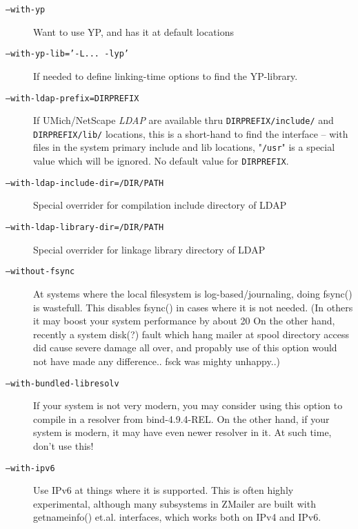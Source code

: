 \begin{multicols}{2}
\begin{description}
\item[\tt --with-yp] \mbox{}

Want to use YP, and has it at default locations

\item[\tt --with-yp-lib='-L... -lyp'] \mbox{}

If needed to define linking-time options to find the YP-library.

\item[\tt --with-ldap-prefix=DIRPREFIX] \mbox{}

If UMich/NetScape {\em LDAP} are available thru {\tt DIRPREFIX/include/}
and {\tt DIRPREFIX/lib/} locations, this is a short-hand to find
the interface -- with files in the system primary include
and lib locations,  "{\tt /usr}" is a special value which will be
ignored.  No default value for {\tt DIRPREFIX}.

\item[\tt --with-ldap-include-dir=/DIR/PATH] \mbox{}

Special overrider for compilation include directory of LDAP

\item[\tt --with-ldap-library-dir=/DIR/PATH] \mbox{}

Special overrider for linkage library directory of LDAP

\item[\tt --without-fsync] \mbox{}

At systems where the local filesystem is log-based/journaling,
doing   fsync()  is wastefull.  This disables fsync() in
cases where it is not needed.    (In others it may boost
your system performance by about 20%
On the other hand, recently a system disk(?) fault which
hang mailer at spool directory access did cause severe
damage all over, and propably use of this option would
not have made any difference..  fsck was mighty unhappy..)

\item[\tt --with-bundled-libresolv] \mbox{}

If your system is not very modern, you may consider using
this option to compile in a resolver from bind-4.9.4-REL.
On the other hand, if your system is modern, it may have
even newer resolver in it.  At such time, don't use this!

\item[\tt --with-ipv6] \mbox{}

Use IPv6 at things where it is supported.  This is often
highly experimental, although many subsystems in ZMailer
are built with   getnameinfo()  et.al. interfaces, which
works both on IPv4 and IPv6.


\end{description}
\end{multicols}
